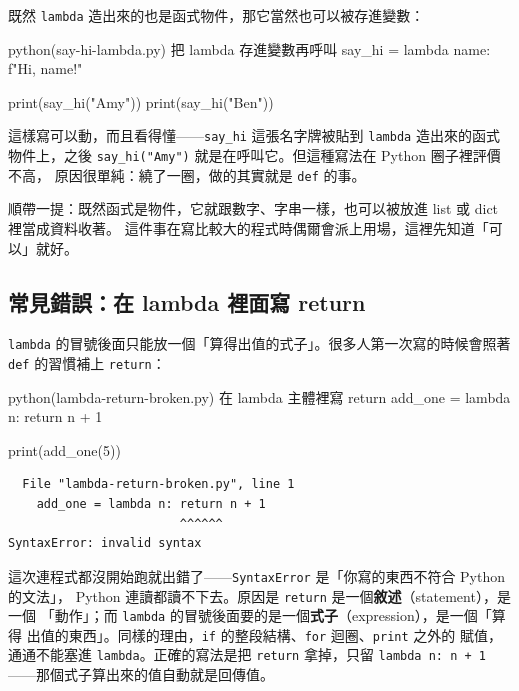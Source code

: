 既然 \texttt{lambda} 造出來的也是函式物件，那它當然也可以被存進變數：

\begin{example}{python}{(say-hi-lambda.py) 把 lambda 存進變數再呼叫}
say_hi = lambda name: f"Hi, {name}!"

print(say_hi("Amy"))
print(say_hi("Ben"))
\end{example}


這樣寫可以動，而且看得懂——\texttt{say\_hi} 這張名字牌被貼到 \texttt{lambda} 造出來的函式
物件上，之後 \texttt{say\_hi("Amy")} 就是在呼叫它。但這種寫法在 Python 圈子裡評價不高，
原因很單純：繞了一圈，做的其實就是 \texttt{def} 的事。


順帶一提：既然函式是物件，它就跟數字、字串一樣，也可以被放進 list 或 dict 裡當成資料收著。
這件事在寫比較大的程式時偶爾會派上用場，這裡先知道「可以」就好。

\subsection*{常見錯誤：在 lambda 裡面寫 return}

\texttt{lambda} 的冒號後面只能放一個「算得出值的式子」。很多人第一次寫的時候會照著
\texttt{def} 的習慣補上 \texttt{return}：

\begin{example}{python}{(lambda-return-broken.py) 在 lambda 主體裡寫 return}
add_one = lambda n: return n + 1

print(add_one(5))
\end{example}

\begin{verbatim}
  File "lambda-return-broken.py", line 1
    add_one = lambda n: return n + 1
                        ^^^^^^
SyntaxError: invalid syntax
\end{verbatim}

這次連程式都沒開始跑就出錯了——\texttt{SyntaxError} 是「你寫的東西不符合 Python 的文法」，
Python 連讀都讀不下去。原因是 \texttt{return} 是一個\textbf{敘述}（statement），是一個
「動作」；而 \texttt{lambda} 的冒號後面要的是一個\textbf{式子}（expression），是一個「算得
出值的東西」。同樣的理由，\texttt{if} 的整段結構、\texttt{for} 迴圈、\texttt{print} 之外的
賦值，通通不能塞進 \texttt{lambda}。正確的寫法是把 \texttt{return} 拿掉，只留
\texttt{lambda n: n + 1}——那個式子算出來的值自動就是回傳值。

